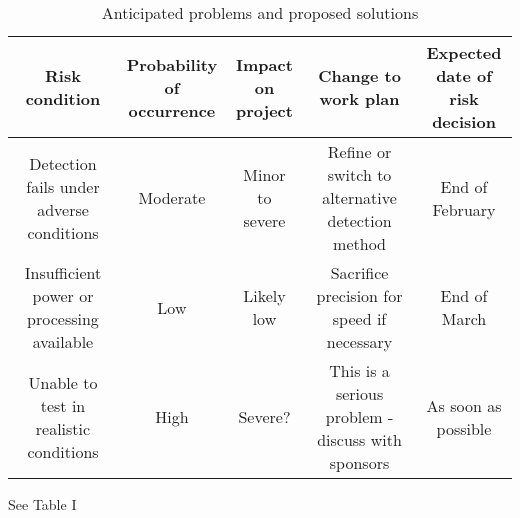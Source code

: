 \begin{table}
\caption{\label{tab:contingency}Anticipated problems and proposed solutions}
\begin{tabular}{c|c|c|c|c}

\parbox[t]{2cm}{Risk\\condition} & \parbox[t]{2.5cm}{Probability\\of occurrence} & \parbox[t]{3cm}{Impact on\\project} & \parbox[t]{3cm}{Change to\\work plan} & \parbox[t]{2.4cm}{Expected\\date of risk\\decision}\\[1.6cm]
\hline

\parbox[t]{2cm}{Detection fails under adverse conditions}&
\parbox[t]{2.5cm}{Moderate}&
\parbox[t]{3cm}{Minor to severe}&
\parbox[t]{3cm}{Refine or switch to alternative detection method}&
\parbox[t]{2.4cm}{End of February}\\

\hline
\parbox[t]{2cm}{Insufficient power or processing available}&
\parbox[t]{2.5cm}{Low}&
\parbox[t]{3cm}{Likely low}&
\parbox[t]{3cm}{Sacrifice precision for speed if necessary}&
\parbox[t]{2.4cm}{End of March}\\

\hline
\parbox[t]{2cm}{Unable to test in realistic conditions}&
\parbox[t]{2.5cm}{High}&
\parbox[t]{3cm}{Severe?}&
\parbox[t]{3cm}{This is a serious problem - discuss with sponsors}&
\parbox[t]{2.4cm}{As soon as possible}\\

\end{tabular}
\end{table}

See Table I